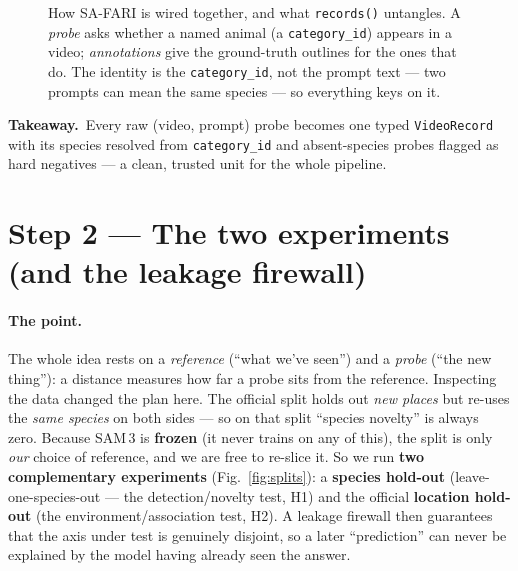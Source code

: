 \documentclass[11pt,a4paper]{article}
\newcommand{\code}[1]{\texttt{#1}}
\newcommand{\takeaway}[1]{\smallskip\noindent%
  \colorbox{forest!8}{\parbox{\dimexpr\linewidth-2\fboxsep\relax}{%
  \small{\color{forest}\textbf{Takeaway.}}\ #1}}\smallskip}
\begin{document}
\begin{figure}[h]
\centering
{}
\caption{How SA-FARI is wired together, and what \code{records()} untangles. A \emph{probe} asks whether a
named animal (a \code{category\_id}) appears in a video; \emph{annotations} give the ground-truth outlines
for the ones that do. The identity is the \code{category\_id}, not the prompt text --- two prompts can mean
the same species --- so everything keys on it.}
\label{fig:schema}
\end{figure}

\takeaway{Every raw (video, prompt) probe becomes one typed \code{VideoRecord} with its species resolved
from \code{category\_id} and absent-species probes flagged as hard negatives --- a clean, trusted unit for
the whole pipeline.}

\section{Step 2 --- The two experiments (and the leakage firewall)}

\paragraph{The point.}
The whole idea rests on a \emph{reference} (``what we've seen'') and a \emph{probe} (``the new thing''): a
distance measures how far a probe sits from the reference. Inspecting the data changed the plan here. The
official split holds out \emph{new places} but re-uses the \emph{same species} on both sides --- so on that
split ``species novelty'' is always zero. Because SAM\,3 is \textbf{frozen} (it never trains on any of
this), the split is only \emph{our} choice of reference, and we are free to re-slice it. So we run
\textbf{two complementary experiments} (Fig.~\ref{fig:splits}): a \textbf{species hold-out}
(leave-one-species-out --- the detection/novelty test, H1) and the official \textbf{location hold-out} (the
environment/association test, H2). A leakage firewall then guarantees that the axis under test is genuinely
disjoint, so a later ``prediction'' can never be explained by the model having already seen the answer.
\end{document}
